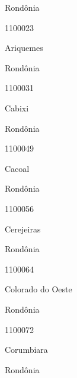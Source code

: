 \documentclass[
  letterpaper,
]{report}
\begin{document}
\n    

\n    

\n      

Rondônia

\n      

1100023

\n      

Ariquemes

\n    

\n    

\n      

Rondônia

\n      

1100031

\n      

Cabixi

\n    

\n    

\n      

Rondônia

\n      

1100049

\n      

Cacoal

\n    

\n    

\n      

Rondônia

\n      

1100056

\n      

Cerejeiras

\n    

\n    

\n      

Rondônia

\n      

1100064

\n      

Colorado do Oeste

\n    

\n    

\n      

Rondônia

\n      

1100072

\n      

Corumbiara

\n    

\n    

\n      

Rondônia

\n      
\end{document}
